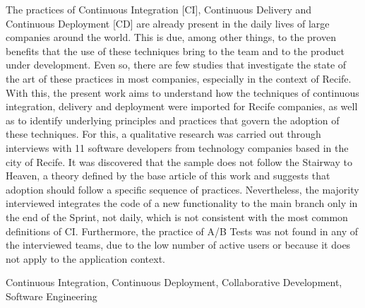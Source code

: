 
\abstract
The practices of Continuous Integration [CI], Continuous Delivery and Continuous Deployment [CD] are already present in the daily lives of large companies around the world. This is due, among other things, to the proven benefits that the use of these techniques bring to the team and to the product under development. Even so, there are few studies that investigate the state of the art of these practices in most companies, especially in the context of Recife. With this, the present work aims to understand how the techniques of continuous integration, delivery and  deployment were imported for Recife companies, as well as to identify underlying principles and practices that govern the adoption of these techniques. For this, a qualitative research was carried out through interviews with 11 software developers from technology companies based in the city of Recife. It was discovered that the sample does not follow the Stairway to Heaven, a theory defined by the base article of this work and suggests that adoption should follow a specific sequence of practices. Nevertheless, the majority interviewed integrates the code of a new functionality to the main branch only in the end of the Sprint, not daily, which is not consistent with the most common definitions of CI. Furthermore, the practice of A/B Tests was not found in any of the interviewed teams, due to the low number of active users or because it does not apply to the application context.


\begin{keywords}
Continuous Integration, Continuous Deployment, Collaborative Development, Software Engineering
\end{keywords}
